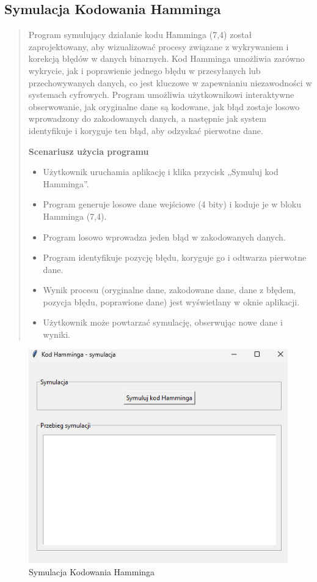 \documentclass[12pt,a4paper]{article}
\begin{document}
\subsection{Symulacja Kodowania Hamminga}
\begin{quotation} \noindent Program symulujący działanie kodu Hamminga (7,4) został zaprojektowany, aby wizualizować procesy związane z wykrywaniem i korekcją błędów w danych binarnych. Kod Hamminga umożliwia zarówno wykrycie, jak i poprawienie jednego błędu w przesyłanych lub przechowywanych danych, co jest kluczowe w zapewnianiu niezawodności w systemach cyfrowych. Program umożliwia użytkownikowi interaktywne obserwowanie, jak oryginalne dane są kodowane, jak błąd zostaje losowo wprowadzony do zakodowanych danych, a następnie jak system identyfikuje i koryguje ten błąd, aby odzyskać pierwotne dane.\newline

\noindent\textbf{Scenariusz użycia programu}
\begin{itemize}
\item Użytkownik uruchamia aplikację i klika przycisk „Symuluj kod Hamminga”.
\item Program generuje losowe dane wejściowe (4 bity) i koduje je w bloku Hamminga (7,4).
\item Program losowo wprowadza jeden błąd w zakodowanych danych.
\item Program identyfikuje pozycję błędu, koryguje go i odtwarza pierwotne dane.
\item Wynik procesu (oryginalne dane, zakodowane dane, dane z błędem, pozycja błędu, poprawione dane) jest wyświetlany w oknie aplikacji.
\item Użytkownik może powtarzać symulację, obserwując nowe dane i wyniki.
\end{itemize}
\end{quotation}

\begin{figure}[!htb]
\begin{center}
\includegraphics[scale=0.45]{pictures/hamming.png}
\caption{Symulacja Kodowania Hamminga}
\label{fig:Symulacja Kodowania Hamminga}
\end{center}
\end{figure}
\end{document}
